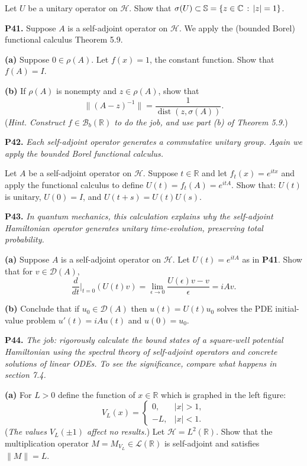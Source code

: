\documentclass[12pt]{amsart}
\newcommand{\cB}{\mathcal{B}}
\newcommand{\cD}{\mathcal{D}}
\newcommand{\cH}{\mathcal{H}}
\newcommand{\cL}{\mathcal{L}}
\newcommand{\CC}{\mathbb{C}}
\newcommand{\RR}{\mathbb{R}}
\newcommand{\eps}{\epsilon}
\newcommand{\prob}[1]{\bigskip\noindent\textbf{#1.}\quad }
\newcommand{\epart}[1]{\medskip\noindent\textbf{(#1)}\quad }
\begin{document}
\medskip\noindent Let $U$ be a unitary operator on $\cH$.  Show that $\sigma(U) \subset \SS = \{z\in\CC\,:\,|z|=1\}$.


\prob{P41}  Suppose $A$ is a self-adjoint operator on $\cH$.  We apply the (bounded Borel) functional calculus Theorem 5.9.

\epart{a}  Suppose $0\in\rho(A)$.  Let $f(x)=1$, the constant function.  Show that $f(A)=I$.

\epart{b}  If $\rho(A)$ is nonempty and $z\in\rho(A)$, show that
	$$\|(A-z)^{-1}\| = \frac{1}{\operatorname{dist}(z,\sigma(A))}.$$
(\emph{Hint. Construct $f\in\cB_b(\RR)$ to do the job, and use part (b) of Theorem 5.9.})


\prob{P42}  \emph{Each self-adjoint operator generates a commutative unitary group.  Again we apply the bounded Borel functional calculus.}

\medskip\noindent Let $A$ be a self-adjoint operator on $\cH$.  Suppose $t\in\RR$ and let $f_t(x) = e^{itx}$ and apply the functional calculus to define $U(t) = f_t(A) = e^{itA}$.  Show that: $U(t)$ is unitary, $U(0) = I$, and $U(t+s) = U(t) U(s)$.


\prob{P43}  \emph{In quantum mechanics, this calculation explains why the self-adjoint Hamiltonian operator generates unitary time-evolution, preserving total probability.}

\epart{a}  Suppose $A$ is a self-adjoint operator on $\cH$.  Let $U(t) = e^{itA}$ as in \textbf{P41}.  Show that for $v\in\cD(A)$,
	$$\frac{d}{dt}\Big|_{t=0} (U(t)v) = \lim_{\eps\to 0} \frac{U(\eps)v-v}{\eps} = i A v.$$

\epart{b}  Conclude that if $u_0\in\cD(A)$ then $u(t) = U(t) u_0$ solves the PDE initial-value problem $u'(t) = iAu(t)$ and $u(0)=u_0$.


\prob{P44}  \emph{The job: rigorously calculate the bound states of a square-well potential Hamiltonian using the spectral theory of self-adjoint operators and concrete solutions of linear ODEs.  To see the significance, compare what happens in section 7.4.}

\epart{a}  For $L>0$ define the function of $x\in\RR$ which is graphed in the left figure:
	$$V_L(x) = \begin{cases} 0, & |x|>1, \\ -L, & |x|<1. \end{cases}$$
(\emph{The values $V_L(\pm 1)$ affect no results.})  Let $\cH=L^2(\RR)$.  Show that the multiplication operator $M = M_{V_L}\in\cL(\RR)$ is self-adjoint and satisfies $\|M\|=L$.
\end{document}
